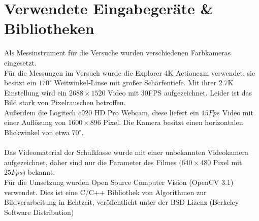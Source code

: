 \section{Verwendete Eingabegeräte \& Bibliotheken}
\label{hardware}
Als Messinstrument für die Versuche wurden verschiedenen Farbkameras eingesetzt.\\
Für die Messungen im Versuch wurde die Explorer 4K Actioncam verwendet, sie besitzt ein $170^\circ$ Weitwinkel-Linse mit großer Schärfentiefe. Mit ihrer 2.7K Einstellung wird ein $2688 \times 1520$ Video mit 30FPS aufgezeichnet. Leider ist das Bild stark von Pixelrauschen betroffen.\\
Außerdem die Logitech c920 HD Pro Webcam, diese liefert ein $15Fps$ Video mit einer Auflösung von $1600\times 896$ Pixel. Die Kamera besitzt einen horizontalen Blickwinkel von etwa $70^\circ$.\\\\
Das Videomaterial der Schulklasse wurde mit einer unbekannten Videokamera aufgezeichnet, daher sind nur die Parameter des Filmes $(640 \times 480$ Pixel mit $25Fps)$ bekannt.\\
Für die Umsetzung wurden Open Source Computer Vision (OpenCV 3.1) verwendet. Dies ist eine C/C++ Bibliothek von Algorithmen zur Bildverarbeitung in Echtzeit, veröffentlicht unter der BSD Lizenz (Berkeley
Software Distribution)\\
\cite{OpenCv_What_Is}\cite{wiki_Wha_is_OPenCV}